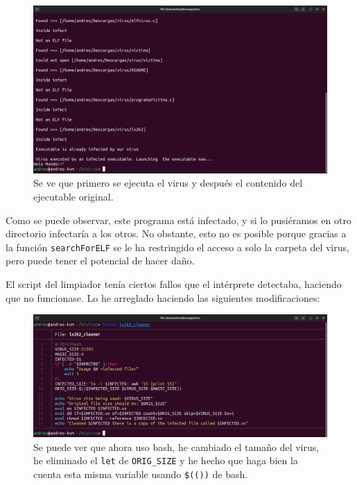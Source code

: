 \documentclass{article}
\begin{document}
\begin{figure}[H]
    \includegraphics[width=\textwidth]{imagenes/victimaInfectada/Captura desde 2022-11-23 12-33-29.png}
    \caption{Se ve que primero se ejecuta el virus y después el contenido del ejecutable original.}
\end{figure}

Como se puede observar, este programa está infectado, y si lo pusiéramos en otro directorio infectaría a los otros. No obstante, esto no es posible porque gracias a la función \verb|searchForELF| se le ha restringido el acceso a solo la carpeta del virus, pero puede tener el potencial de hacer daño.

\bigskip

El script del limpiador tenía ciertos fallos que el intérprete detectaba, haciendo que no funcionase. Lo he arreglado haciendo las siguientes modificaciones: 

\begin{figure}[H]
    \includegraphics[width=\textwidth]{imagenes/Captura desde 2022-11-23 12-44-29.png}
    \caption{Se puede ver que ahora uso bash, he cambiado el tamaño del virus, he eliminado el \texttt{let} de \texttt{ORIG\_SIZE} y he hecho que haga bien la cuenta esta misma variable usando \texttt{\$(())} de bash.}
\end{figure}
\end{document}
